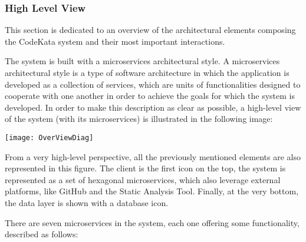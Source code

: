 \subsubsection{High Level View}
This section is dedicated to an overview of the architectural elements composing the CodeKata system and their most important interactions. 

The \app system is built with a microservices architectural style. A microservices architectural style is a type of software architecture in which the application is developed as a collection of services, which are units of functionalities designed to cooperate with one another in order to achieve the goals for which the system is developed. In order to make this description as clear as possible, a high-level view of the system (with its microservices) is illustrated in the following image:
\begin{center}
\texttt{[image: OverViewDiag]}
\end{center}


From a very high-level perspective, all the previously mentioned elements are also represented in this figure. The client is the first icon on the top, the \app system is represented as a set of hexagonal microservices, which also leverage external platforms, like GitHub and the Static Analysis Tool. Finally, at the very bottom, the data layer is shown with a database icon.

There are seven microservices in the \app system, each one offering some functionality, described as follows:

